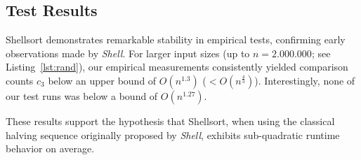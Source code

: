 \subsection{Test Results}
Shellsort demonstrates remarkable stability in empirical tests, confirming early observations made by \textit{Shell}.
For larger input sizes (up to $n = 2.000.000$; see Listing~\ref{lst:rand}), our empirical measurements consistently yielded comparison counts $c_3$ below an upper bound of $O(n^{1.3})$  ($< O(n^{\frac{4}{3}})$).
Interestingly, none of our test runs was below a bound of $O(n^{1.27})$.

\noindent
These results support the hypothesis that Shellsort, when using the classical halving sequence originally proposed by \textit{Shell}, exhibits sub-quadratic runtime behavior on average.
